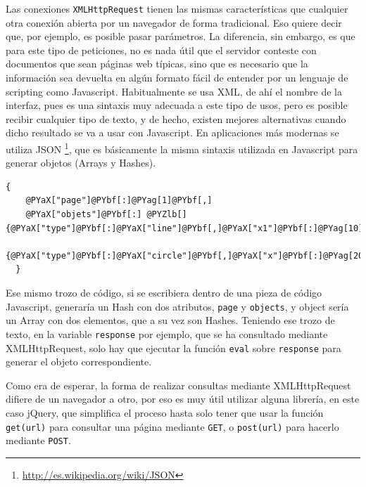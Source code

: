 Las conexiones \texttt{XMLHttpRequest} tienen las mismas características que cualquier otra conexión abierta por un navegador de forma tradicional. Eso quiere decir que, por ejemplo, es posible pasar parámetros. La diferencia, sin embargo, es que para este tipo de peticiones, no es nada útil que el servidor conteste con documentos que sean páginas web típicas, sino que es necesario que la información sea devuelta en algún formato fácil de entender por un lenguaje de scripting como Javascript. Habitualmente se usa XML, de ahí el nombre de la interfaz, pues es una sintaxis muy adecuada a este tipo de usos, pero es posible recibir cualquier tipo de texto, y de hecho, existen mejores alternativas cuando dicho resultado se va a usar con Javascript. En aplicaciones más modernas se utiliza JSON \footnote{\url{http://es.wikipedia.org/wiki/JSON}}, que es básicamente la misma sintaxis utilizada en Javascript para generar objetos (Arrays y Hashes).

\begin{Verbatim}[commandchars=@\[\]]
  {
    @PYaX["page"]@PYbf[:]@PYag[1]@PYbf[,]
    @PYaX["objets"]@PYbf[:] @PYZlb[]{@PYaX["type"]@PYbf[:]@PYaX["line"]@PYbf[,]@PYaX["x1"]@PYbf[:]@PYag[10]@PYbf[,]@PYaX["x2"]@PYbf[:]@PYag[20]@PYbf[,]@PYaX["y1"]@PYbf[:]@PYag[0]@PYbf[,]@PYaX["y2"]@PYbf[:]@PYag[5]}@PYbf[,]
               {@PYaX["type"]@PYbf[:]@PYaX["circle"]@PYbf[,]@PYaX["x"]@PYbf[:]@PYag[20]@PYbf[,]@PYaX["y"]@PYbf[:]@PYag[20]@PYbf[,]@PYaX["radius"]@PYbf[:]@PYag[15]}@PYZrb[]
  }
\end{Verbatim}


Ese mismo trozo de código, si se escribiera dentro de una pieza de código Javascript, generaría un Hash con dos atributos, \texttt{page} y \texttt{objects}, y object sería un Array con dos elementos, que a su vez son Hashes. Teniendo ese trozo de texto, en la variable \texttt{response} por ejemplo, que se ha consultado mediante XMLHttpRequest, solo hay que ejecutar la función \texttt{eval} sobre \texttt{response} para generar el objeto correspondiente.

Como era de esperar, la forma de realizar consultas mediante XMLHttpRequest difiere de un navegador a otro, por eso es muy útil utilizar alguna librería, en este caso jQuery, que simplifica el proceso hasta solo tener que usar la función \texttt{get(url)} para consultar una página mediante \texttt{GET}, o \texttt{post(url)} para hacerlo mediante \texttt{POST}.

